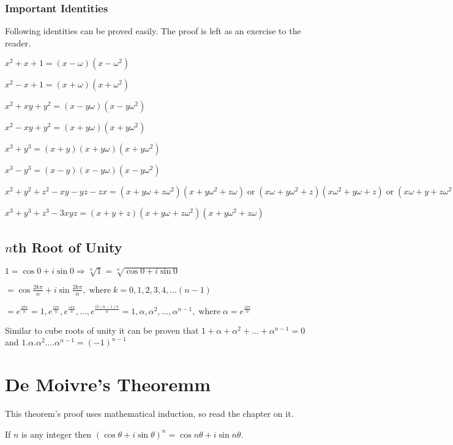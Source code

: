 \subsubsection{Important Identities}
Following identities can be proved easily. The proof is left as an exercise to the reader.
\startitemize[n]
\item $x^2 + x + 1 = (x - \omega)(x - \omega^2)$
\item $x^2 - x + 1 = (x + \omega)(x + \omega^2)$
\item $x^2 + xy + y^2 = (x - y\omega)(x - y\omega^2)$
\item $x^2 - xy + y^2 = (x + y\omega)(x + y\omega^2)$
\item $x^3 + y^3 = (x + y)(x + y\omega)(x + y\omega^2)$
\item $x^3 - y^3 = (x - y)(x - y\omega)(x - y\omega^2)$
\item $x^2 + y^2 + z^2 - xy - yz - zx = (x + y\omega + z\omega^2)(x + y\omega^2 + z\omega) \;\text{or}\; (x\omega + y\omega^2 +
  z)(x\omega^2 + y\omega + z)
  \;\text{or}\;(x\omega + y + z\omega^2)(x\omega^2 + y + z\omega)$
\item $x^3 + y^3 + z^3 - 3xyz = (x + y + z)(x + y\omega + z\omega^2)(x+ y\omega^2 + z\omega)$
\stopitemize

\subsection{$n$th Root of Unity}
$1 = \cos0 + i\sin 0 \Rightarrow \sqrt[n]{1} = \sqrt[n]{\cos0 + i\sin0}$

\noindent $=\cos\frac{2k\pi}{n} + i\sin\frac{2k\pi}{n}, \;\text{where}\; k = 0, 1, 2, 3, 4, \ldots (n - 1)$

\noindent $= e^{\frac{2k\pi}{n}} = 1, e^{\frac{i2\pi}{n}}, e^{\frac{i4\pi}{n}}, \ldots, e^{\frac{i2(n - 1)\pi}{n}} = 1, \alpha, \alpha^2,
\ldots, \alpha^{n - 1}, \;\text{where}\;\alpha = e^{\frac{i2\pi}{n}}$

\noindent Similar to cube roots of unity it can be proven that $1 + \alpha + \alpha^2 + \ldots + \alpha^{n - 1} = 0$
and $1.\alpha.\alpha^2.\ldots\alpha^{n - 1} = (-1)^{n - 1}$

\section{De Moivre's Theoremm}
This theorem's proof uses mathematical induction, so read the chapter on it.

 If $n$ is any integer then $(\cos\theta + i\sin\theta)^n = \cos n\theta + i\sin n\theta$.

